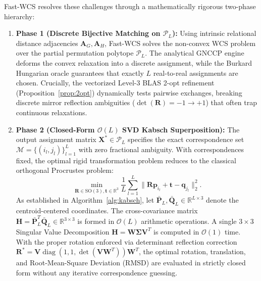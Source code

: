 \documentclass[conference]{IEEEtran}
\begin{document}
Fast-WCS resolves these challenges through a mathematically rigorous two-phase hierarchy:
\begin{enumerate}
    \item \textbf{Phase 1 (Discrete Bijective Matching on $\mathcal{P}_L$):} Using intrinsic relational distance adjacencies $\mathbf{A}_G, \mathbf{A}_H$, Fast-WCS solves the non-convex WCS problem over the partial permutation polytope $\mathcal{P}_L$. The analytical GNCCP engine deforms the convex relaxation into a discrete assignment, while the Burkard Hungarian oracle guarantees that exactly $L$ real-to-real assignments are chosen. Crucially, the vectorized Level-3 BLAS 2-opt refinement (Proposition~\ref{prop:2opt}) dynamically tests pairwise exchanges, breaking discrete mirror reflection ambiguities ($\det(\mathbf{R}) = -1 \to +1$) that often trap continuous relaxations.
    \item \textbf{Phase 2 (Closed-Form $\mathcal{O}(L)$ SVD Kabsch Superposition):} The output assignment matrix $\mathbf{X}^* \in \mathcal{P}_L$ specifies the exact correspondence set $\mathcal{M} = \{(i_l, j_l)\}_{l=1}^L$ with zero fractional ambiguity. With correspondences fixed, the optimal rigid transformation problem reduces to the classical orthogonal Procrustes problem:
    \begin{equation}
    \min_{\mathbf{R} \in \mathrm{SO}(3), \mathbf{t} \in \mathbb{R}^3} \frac{1}{L} \sum_{l=1}^L \|\mathbf{R} \mathbf{p}_{i_l} + \mathbf{t} - \mathbf{q}_{j_l}\|_2^2.
    \label{eq:procrustes}
    \end{equation}
    As established in Algorithm~\ref{alg:kabsch}, let $\bar{\mathbf{P}}_L, \bar{\mathbf{Q}}_L \in \mathbb{R}^{L \times 3}$ denote the centroid-centered coordinates. The cross-covariance matrix $\mathbf{H} = \bar{\mathbf{P}}_L^T \bar{\mathbf{Q}}_L \in \mathbb{R}^{3 \times 3}$ is formed in $\mathcal{O}(L)$ arithmetic operations. A single $3 \times 3$ Singular Value Decomposition $\mathbf{H} = \mathbf{W}\mathbf{\Sigma}\mathbf{V}^T$ is computed in $\mathcal{O}(1)$ time. With the proper rotation enforced via determinant reflection correction $\mathbf{R}^* = \mathbf{V} \operatorname{diag}(1, 1, \det(\mathbf{V}\mathbf{W}^T)) \mathbf{W}^T$, the optimal rotation, translation, and Root-Mean-Square Deviation (RMSD) are evaluated in strictly closed form without any iterative correspondence guessing.
\end{enumerate}
\end{document}
